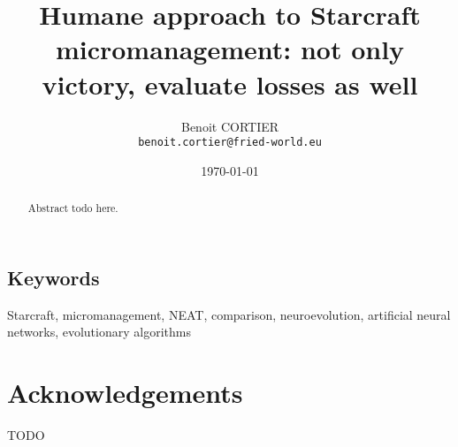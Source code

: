 \documentclass[a4paper, 11pt]{article}
\title{Humane approach to Starcraft micromanagement: not only victory, evaluate losses as well}
\author{Benoit CORTIER\\
        \texttt{benoit.cortier@fried-world.eu}}
\date{\today}
\begin{document}
\maketitle

\begin{abstract}
    Abstract todo here.
\end{abstract}

\subsection*{Keywords}
Starcraft, micromanagement, NEAT, comparison, neuroevolution, artificial neural networks, evolutionary algorithms













\section*{Acknowledgements}

TODO


{}
\end{document}
